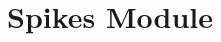 \documentclass[12pt]{article}
\newcommand{\m}[1]{\mbox{#1}}
\begin{document}



\newpage

\section*{Spikes Module}
\end{document}
